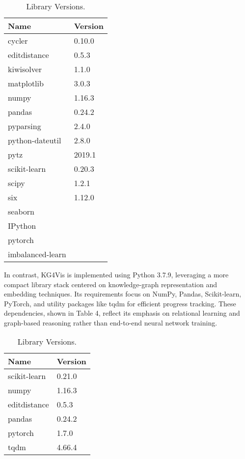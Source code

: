 \begin{table}[h!]
    \centering
    \caption{Library Versions.}
    \begin{tabular}{|l|l|}
    \hline
    \textbf{Name} & \textbf{Version} \\
    \hline
    cycler       & 0.10.0 \\
    editdistance & 0.5.3  \\
    kiwisolver   & 1.1.0  \\
    matplotlib   & 3.0.3  \\
    numpy        & 1.16.3 \\
    pandas       & 0.24.2 \\
    pyparsing    & 2.4.0  \\
    python-dateutil & 2.8.0  \\
    pytz        & 2019.1 \\
    scikit-learn & 0.20.3 \\
    scipy       & 1.2.1  \\
    six         & 1.12.0 \\
    seaborn     &   \\
    IPython     &  \\
    pytorch   &   \\
    imbalanced-learn &  \\
    \hline
    \end{tabular}
    \end{table}

\vspace{40cm}

\noindent In contrast, KG4Vis is implemented using Python 3.7.9, leveraging a more compact library stack centered on knowledge-graph representation and embedding techniques. Its requirements focus on NumPy, Pandas, Scikit-learn, PyTorch, and utility packages like tqdm for efficient progress tracking. These dependencies, shown in Table 4, reflect its emphasis on relational learning and graph-based reasoning rather than end-to-end neural network training.

\begin{table}[H]
    \centering
    \caption{Library Versions.}
    \begin{tabular}{|l|l|}
    \hline
    \textbf{Name} & \textbf{Version} \\
    \hline
    scikit-learn & 0.21.0 \\
    numpy        & 1.16.3 \\
    editdistance & 0.5.3  \\
    pandas       & 0.24.2 \\
    pytorch   &   1.7.0\\
    tqdm &   4.66.4\\
    \hline
    \end{tabular}
    \end{table}


